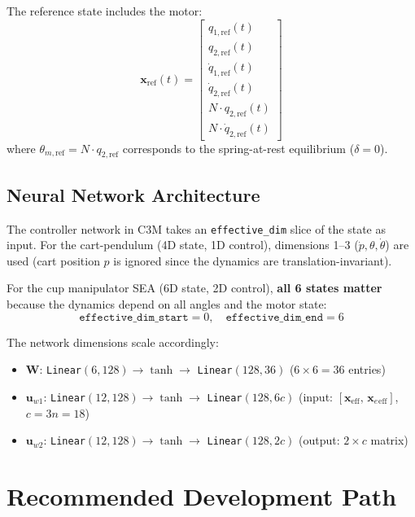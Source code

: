 \documentclass[11pt, a4paper]{article}
\newcommand{\bu}{\bm{u}}
\newcommand{\bx}{\bm{x}}
\newcommand{\bW}{\bm{W}}
\begin{document}
The reference state includes the motor:
\begin{equation}
\bx_\text{ref}(t) = \begin{bmatrix}
q_{1,\text{ref}}(t) \\
q_{2,\text{ref}}(t) \\
\dot{q}_{1,\text{ref}}(t) \\
\dot{q}_{2,\text{ref}}(t) \\
N \cdot q_{2,\text{ref}}(t) \\
N \cdot \dot{q}_{2,\text{ref}}(t)
\end{bmatrix}
\end{equation}
where $\theta_{m,\text{ref}} = N \cdot q_{2,\text{ref}}$ corresponds to
the spring-at-rest equilibrium ($\delta = 0$).

\subsection{Neural Network Architecture}

The controller network in C3M takes an \texttt{effective\_dim} slice of the
state as input.  For the cart-pendulum (4D state, 1D control), dimensions
1--3 ($\dot{p}, \theta, \dot{\theta}$) are used (cart position $p$ is ignored
since the dynamics are translation-invariant).

For the cup manipulator SEA (6D state, 2D control), \textbf{all 6 states
matter} because the dynamics depend on all angles and the motor state:
\[
\texttt{effective\_dim\_start} = 0, \quad
\texttt{effective\_dim\_end} = 6
\]

The network dimensions scale accordingly:
\begin{itemize}
\item $\bW$: \texttt{Linear}$(6, 128) \to \tanh \to$ \texttt{Linear}$(128, 36)$
      \quad ($6 \times 6 = 36$ entries)
\item $\bu_{w1}$: \texttt{Linear}$(12, 128) \to \tanh \to$ \texttt{Linear}$(128, 6c)$
      \quad (input: $[\bx_\text{eff},\, \bx_e{}_\text{eff}]$, $c = 3n = 18$)
\item $\bu_{w2}$: \texttt{Linear}$(12, 128) \to \tanh \to$ \texttt{Linear}$(128, 2c)$
      \quad (output: $2 \times c$ matrix)
\end{itemize}


\section{Recommended Development Path}
\label{sec:roadmap}
\end{document}
